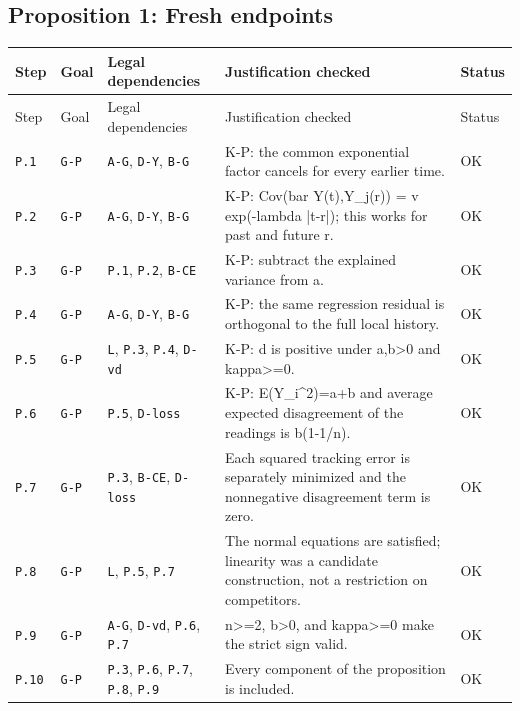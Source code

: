 \documentclass[11pt,letterpaper]{article}
\begin{document}
{\subsection{Proposition 1: Fresh endpoints}
\begin{longtable}{>{\raggedright\arraybackslash}p{.10\linewidth}>{\raggedright\arraybackslash}p{.08\linewidth}>{\raggedright\arraybackslash}p{.19\linewidth}>{\raggedright\arraybackslash}p{.46\linewidth}>{\raggedright\arraybackslash}p{.08\linewidth}}
\toprule
Step & Goal & Legal dependencies & Justification checked & Status \\
\midrule\endfirsthead
\toprule
Step & Goal & Legal dependencies & Justification checked & Status \\
\midrule\endhead
\bottomrule\endfoot
\texttt{P.1} & \texttt{G-P} & \texttt{A-G}, \texttt{D-Y}, \texttt{B-G} & K-P: the common exponential factor cancels for every earlier time. & OK \\[3pt]
\texttt{P.2} & \texttt{G-P} & \texttt{A-G}, \texttt{D-Y}, \texttt{B-G} & K-P: Cov(bar Y(t),Y\_j(r)) = v exp(-lambda |t-r|); this works for past and future r. & OK \\[3pt]
\texttt{P.3} & \texttt{G-P} & \texttt{P.1}, \texttt{P.2}, \texttt{B-CE} & K-P: subtract the explained variance from a. & OK \\[3pt]
\texttt{P.4} & \texttt{G-P} & \texttt{A-G}, \texttt{D-Y}, \texttt{B-G} & K-P: the same regression residual is orthogonal to the full local history. & OK \\[3pt]
\texttt{P.5} & \texttt{G-P} & \texttt{L}, \texttt{P.3}, \texttt{P.4}, \texttt{D-vd} & K-P: d is positive under a,b>0 and kappa>=0. & OK \\[3pt]
\texttt{P.6} & \texttt{G-P} & \texttt{P.5}, \texttt{D-loss} & K-P: E(Y\_i\textasciicircum{}2)=a+b and average expected disagreement of the readings is b(1-1/n). & OK \\[3pt]
\texttt{P.7} & \texttt{G-P} & \texttt{P.3}, \texttt{B-CE}, \texttt{D-loss} & Each squared tracking error is separately minimized and the nonnegative disagreement term is zero. & OK \\[3pt]
\texttt{P.8} & \texttt{G-P} & \texttt{L}, \texttt{P.5}, \texttt{P.7} & The normal equations are satisfied; linearity was a candidate construction, not a restriction on competitors. & OK \\[3pt]
\texttt{P.9} & \texttt{G-P} & \texttt{A-G}, \texttt{D-vd}, \texttt{P.6}, \texttt{P.7} & n>=2, b>0, and kappa>=0 make the strict sign valid. & OK \\*[3pt]
\texttt{P.10} & \texttt{G-P} & \texttt{P.3}, \texttt{P.6}, \texttt{P.7}, \texttt{P.8}, \texttt{P.9} & Every component of the proposition is included. & OK \\[3pt]
\end{longtable}
}
\end{document}
